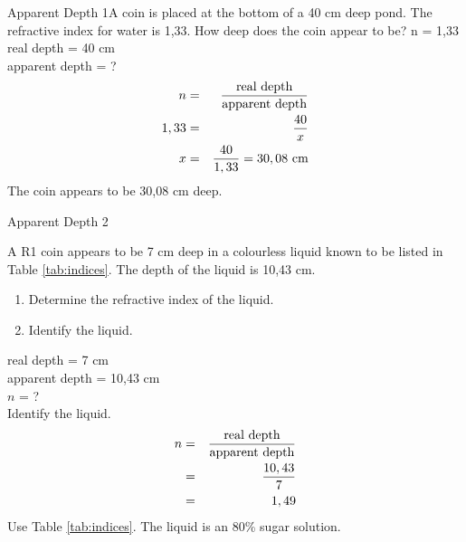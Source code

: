 \begin{wex}{Apparent Depth 1}{A coin is placed at the bottom of a 40 cm deep pond. The refractive index for water is 1,33. How deep does the coin appear to be?}
{
n = 1,33\\
real depth = 40 cm\\
apparent depth = ?
\begin{eqnarray*}
n &=& \frac{\textnormal{real depth}}{\textnormal{apparent depth}}\\
1,33 &=& \frac{40}{x}\\
x &=& \frac{40}{1,33} = 30,08\textnormal{ cm}
\end{eqnarray*}
The coin appears to be 30,08 cm deep.}
\end{wex}

\begin{wex}{Apparent Depth 2}{A R1 coin appears to be 7 cm deep in a colourless liquid known to be listed in Table \ref{tab:indices}. The depth of the liquid is 10,43 cm. \begin{enumerate} \item Determine the refractive index of the liquid.\\ \item Identify the liquid. \end{enumerate}}{
	real depth = 7 cm\\
	apparent depth = 10,43 cm\\
	$n$ = ?\\
	Identify the liquid.
\begin{eqnarray*}
n &=&\frac{\textnormal{real depth}}{\textnormal{apparent depth}}\\
&=&\frac{10,43}{7}\\
&=&1,49
\end{eqnarray*}
 Use Table \ref{tab:indices}. The liquid is an 80\% sugar solution.}
\end{wex}

